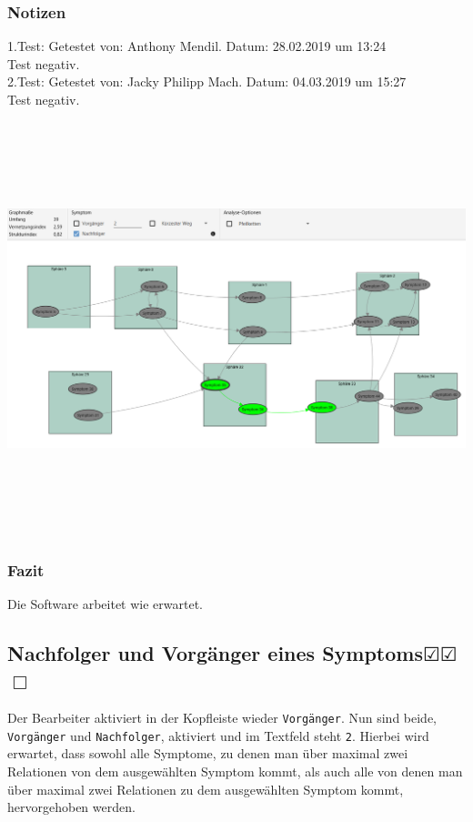 \documentclass[enabledeprecatedfontcommands]{scrartcl}
\newcommand{\subsectiont}[2]{\subsection[#1]{#1{\normalsize\normalfont #2}}}
\newcommand{\leer}{$\Box$}
\newcommand{\ok}{$\CheckedBox$}
\begin{document}
\subsubsection{Notizen}
1.Test: Getestet von: Anthony Mendil. Datum: 28.02.2019 um 13:24 \\
Test negativ. \\
2.Test: Getestet von: Jacky Philipp Mach. Datum: 04.03.2019 um 15:27 \\
Test negativ.
\begin{center}
\includegraphics[height=12cm, angle=90]{analysenachfolger.PNG}
\end{center}
\subsubsection{Fazit}
Die Software arbeitet wie erwartet.

\subsectiont{Nachfolger und Vorgänger eines Symptoms}{\dotfill\ok\ok\leer}
Der Bearbeiter aktiviert in der Kopfleiste wieder \texttt{Vorgänger}. Nun sind beide, \texttt{Vorgänger} und \texttt{Nachfolger}, aktiviert und im Textfeld steht \texttt{2}. Hierbei wird erwartet, dass sowohl alle Symptome, zu denen man über maximal zwei Relationen von dem ausgewählten Symptom kommt, als auch alle von denen man über maximal zwei Relationen zu dem ausgewählten Symptom kommt, hervorgehoben werden. 
\end{document}
